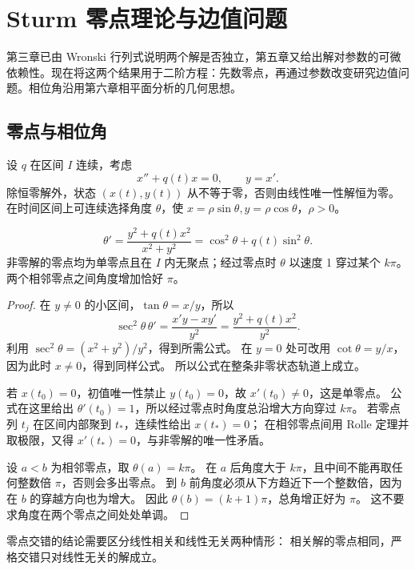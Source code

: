 \chapter{Sturm 零点理论与边值问题}\label{chap:sturm}

第三章已由 Wronski 行列式说明两个解是否独立，第五章又给出解对参数的可微依赖性。现在将这两个结果用于二阶方程：先数零点，再通过参数改变研究边值问题。相位角沿用第六章相平面分析的几何思想。

\section{零点与相位角}
设 $q$ 在区间 $I$ 连续，考虑
\[
 x''+q(t)x=0,\qquad y=x'.
\]
除恒零解外，状态 $(x(t),y(t))$ 从不等于零，否则由线性唯一性解恒为零。
在时间区间上可连续选择角度 $\theta$，使
$x=\rho\sin\theta,y=\rho\cos\theta$，$\rho>0$。
\begin{proposition}\label{prop:arnold-angle}
\[
 \theta'=\frac{y^2+q(t)x^2}{x^2+y^2}
 =\cos^2\theta+q(t)\sin^2\theta.
\]
非零解的零点均为单零点且在 $I$ 内无聚点；经过零点时 $\theta$ 以速度 1 穿过某个 $k\pi$。
两个相邻零点之间角度增加恰好 $\pi$。
\end{proposition}
\begin{proof}
在 $y\ne0$ 的小区间，$\tan\theta=x/y$，所以
\[
 \sec^2\theta\,\theta'
 =\frac{x'y-xy'}{y^2}=\frac{y^2+q(t)x^2}{y^2}.
\]
利用 $\sec^2\theta=(x^2+y^2)/y^2$，得到所需公式。
在 $y=0$ 处可改用 $\cot\theta=y/x$，因为此时 $x\ne0$，得到同样公式。
所以公式在整条非零状态轨道上成立。

若 $x(t_0)=0$，初值唯一性禁止 $y(t_0)=0$，故 $x'(t_0)\ne0$，这是单零点。
公式在这里给出 $\theta'(t_0)=1$，所以经过零点时角度总沿增大方向穿过 $k\pi$。
若零点列 $t_j$ 在区间内部聚到 $t_*$，连续性给出 $x(t_*)=0$；
在相邻零点间用 Rolle 定理并取极限，又得 $x'(t_*)=0$，与非零解的唯一性矛盾。

设 $a<b$ 为相邻零点，取 $\theta(a)=k\pi$。
在 $a$ 后角度大于 $k\pi$，且中间不能再取任何整数倍 $\pi$，否则会多出零点。
到 $b$ 前角度必须从下方趋近下一个整数倍，因为在 $b$ 的穿越方向也为增大。
因此 $\theta(b)=(k+1)\pi$，总角增正好为 $\pi$。
这不要求角度在两个零点之间处处单调。
\end{proof}
零点交错的结论需要区分线性相关和线性无关两种情形：
相关解的零点相同，严格交错只对线性无关的解成立。


